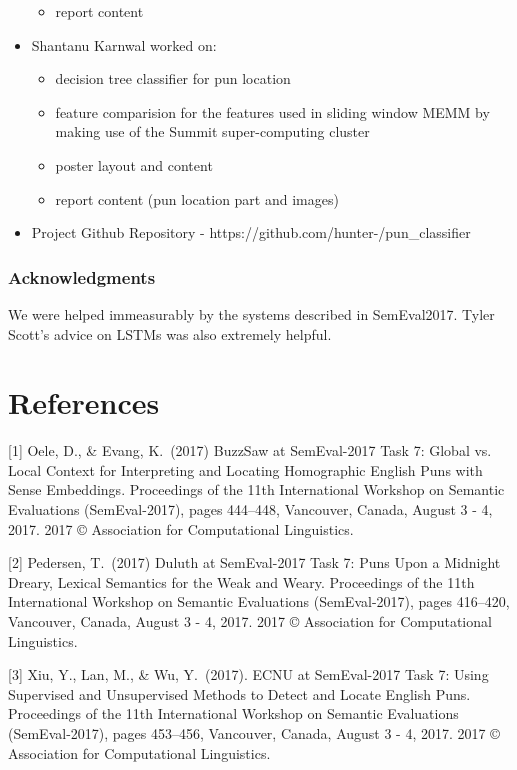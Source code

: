\documentclass{article}
\begin{document}
\begin{itemize}
\begin{itemize}
		\item report content
	\end{itemize}
\item Shantanu Karnwal worked on:
	\begin{itemize}
		\item decision tree classifier for pun location
		\item feature comparision for the features used in sliding window MEMM by making use of the Summit super-computing cluster
		\item poster layout and content
		\item report content (pun location part and images)
	\end{itemize}
\item Project Github Repository - https://github.com/hunter-/pun\_classifier
\end{itemize}

\subsubsection*{Acknowledgments}

We were helped immeasurably by the systems described in SemEval2017. Tyler
Scott's advice on LSTMs was also extremely helpful.

\section*{References}

\medskip

\small

[1] Oele, D., \& Evang, K.\ (2017) BuzzSaw at SemEval-2017 Task 7:
Global vs. Local Context for Interpreting and Locating Homographic English Puns
with Sense Embeddings. Proceedings of the 11th International Workshop on
Semantic Evaluations (SemEval-2017), pages 444–448, Vancouver, Canada, August 3
- 4, 2017. 2017 © Association for Computational Linguistics.

[2] Pedersen, T.\ (2017) Duluth at SemEval-2017 Task 7: Puns Upon a Midnight
Dreary, Lexical Semantics for the Weak and Weary. Proceedings of the 11th
International Workshop on Semantic Evaluations (SemEval-2017), pages 416–420,
Vancouver, Canada, August 3 - 4, 2017. 2017 © Association for Computational
Linguistics.

[3] Xiu, Y., Lan, M., \& Wu, Y.\ (2017). ECNU at SemEval-2017 Task 7: Using
Supervised and Unsupervised Methods to Detect and Locate English Puns.
Proceedings of the 11th International Workshop on Semantic Evaluations
(SemEval-2017), pages 453–456, Vancouver, Canada, August 3 - 4, 2017. 2017 ©
Association for Computational Linguistics.
\end{document}
